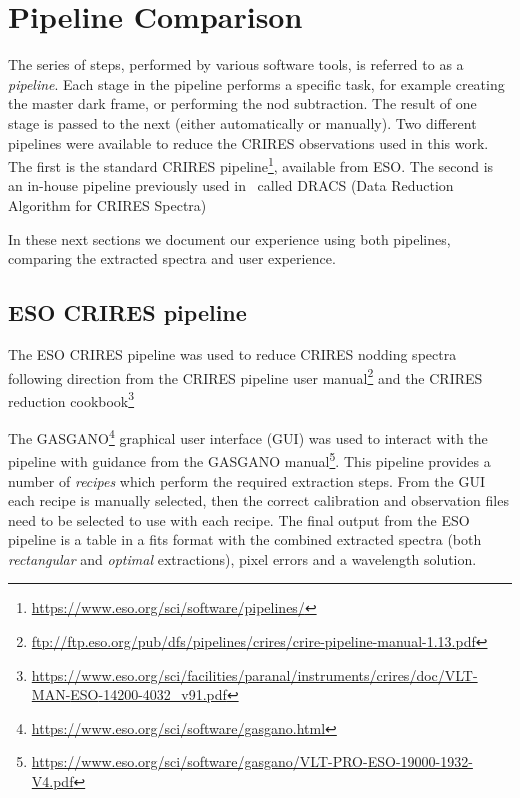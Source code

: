 
\section{Pipeline Comparison}
\label{sec:pipelines}
 The series of steps, performed by various software tools, is referred to as a \emph{pipeline}.
Each stage in the pipeline performs a specific task, for example creating the master dark frame, or performing the nod subtraction.
The result of one stage is passed to the next (either automatically or manually).
Two different pipelines were available to reduce the {CRIRES} observations used in this work.
The first is the standard {CRIRES} pipeline\footnote{\href{https://www.eso.org/sci/software/pipelines/}{https://www.eso.org/sci/software/pipelines/}}, available from {ESO}.
The second is an in-house pipeline previously used in~\citet{figueira_radial_2010} called {DRACS} (Data Reduction Algorithm for {CRIRES} Spectra) 

In these next sections we document our experience using both pipelines, comparing the extracted spectra and user experience.


\subsection{{ESO} {CRIRES} pipeline}
\label{subsec:eso-crires}
The {ESO} {CRIRES} pipeline was used to reduce {CRIRES} nodding spectra following direction from the {CRIRES} pipeline user manual\footnote{\href{ftp://ftp.eso.org/pub/dfs/pipelines/crires/crire-pipeline-manual-1.13.pdf}{ftp://ftp.eso.org/pub/dfs/pipelines/crires/crire-pipeline-manual-1.13.pdf}} and the {CRIRES} reduction cookbook\footnote{\href{https://www.eso.org/sci/facilities/paranal/instruments/crires/doc/VLT-MAN-{ESO}-14200-4032\_v91.pdf}{https://www.eso.org/sci/facilities/paranal/instruments/crires/doc/VLT-MAN-{ESO}-14200-4032\_v91.pdf}}

The GASGANO\footnote{\href{https://www.eso.org/sci/software/gasgano.html}{https://www.eso.org/sci/software/gasgano.html}} graphical user interface (GUI) was used to interact with the pipeline with guidance from the GASGANO manual\footnote{\href{https://www.eso.org/sci/software/gasgano/VLT-PRO-{ESO}-19000-1932-V4.pdf}{https://www.eso.org/sci/software/gasgano/VLT-PRO-{ESO}-19000-1932-V4.pdf}}.
This pipeline provides a number of \emph{recipes} which perform the required extraction steps.
From the GUI each recipe is manually selected, then the correct calibration and observation files need to be selected to use with each recipe.
The final output from the {ESO} pipeline is a table in a fits format with the combined extracted spectra (both \emph{rectangular} and \emph{optimal} extractions), pixel errors and a wavelength solution.

